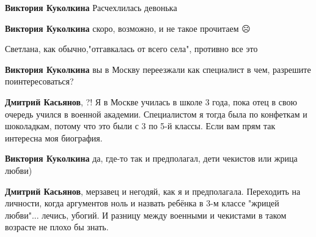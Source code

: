 \begin{itemize}
\begin{itemize}
\textbf{Виктория Куколкина} Расчехлилась девонька

 
\textbf{Виктория Куколкина} скоро, возможно, и не такое прочитаем ☹️

 
Светлана, как обычно,"отгавкалась от всего села", противно все это

 
\textbf{Виктория Куколкина} вы в Москву переезжали как специалист в чем, разрешите поинтересоваться?

 
\textbf{Дмитрий Касьянов}, ?! Я в Москве училась в школе 3 года, пока отец в свою очередь учился в военной академии. Специалистом я тогда была по конфеткам и шоколадкам, потому что это были с 3 по 5-й классы. Если вам прям так интересна моя биография.

 
\textbf{Виктория Куколкина} да, где-то так и предполагал, дети чекистов или жрица любви)

 
\textbf{Дмитрий Касьянов}, мерзавец и негодяй, как я и предполагала. Переходить
на личности, когда аргументов ноль и назвать ребёнка в 3-м классе "жрицей
любви"... лечись, убогий. И разницу между военными и чекистами в таком возрасте
не плохо бы знать.


\end{itemize}
\end{itemize}
